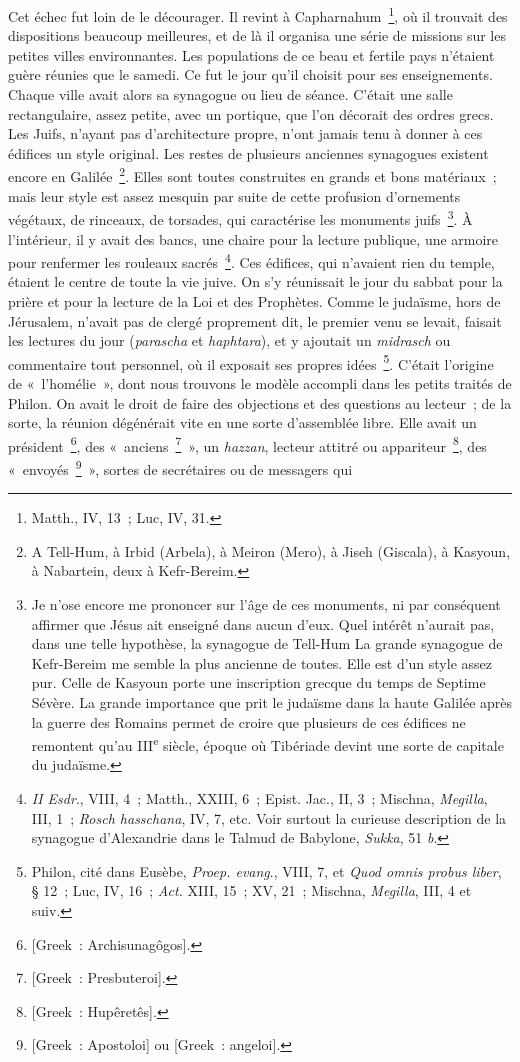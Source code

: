\documentclass[french,twoside]{book} %
\begin{document}
Cet échec fut loin de le décourager. Il revint à Capharnahum \footnote{Matth., IV, 13 ; Luc, IV, 31.}, où il trouvait des dispositions beaucoup meilleures, et de là il organisa une série de missions sur les petites villes environnantes. Les populations de ce beau et fertile pays n’étaient guère réunies que le samedi. Ce fut le jour qu’il choisit pour ses enseignements. Chaque ville avait alors sa synagogue ou lieu de séance. C’était une salle rectangulaire, assez petite, avec un portique, que l’on décorait des ordres grecs. Les Juifs, n’ayant pas d’architecture propre, n’ont jamais tenu à donner à ces édifices un style original. Les restes de plusieurs anciennes synagogues existent encore en Galilée \footnote{A Tell-Hum, à Irbid (Arbela), à Meiron (Mero), à Jiseh (Giscala), à Kasyoun, à Nabartein, deux à Kefr-Bereim.}. Elles sont toutes construites en grands et bons matériaux ; mais leur style est assez mesquin par suite de cette profusion d’ornements végétaux, de rinceaux, de torsades, qui caractérise les monuments juifs \footnote{ Je n’ose encore me prononcer sur l’âge de ces monuments, ni par conséquent affirmer que Jésus ait enseigné dans aucun d’eux. Quel intérêt n’aurait pas, dans une telle hypothèse, la synagogue de Tell-Hum La grande synagogue de Kefr-Bereim me semble la plus ancienne de toutes. Elle est d’un style assez pur. Celle de Kasyoun porte une inscription grecque du temps de Septime Sévère. La grande importance que prit le judaïsme dans la haute Galilée après la guerre des Romains permet de croire que plusieurs de ces édifices ne remontent qu’au III\textsuperscript{e} siècle, époque où Tibériade devint une sorte de capitale du judaïsme.}. À l’intérieur, il y avait des bancs, une chaire pour la lecture publique, une armoire pour renfermer les rouleaux sacrés \footnote{{\itshape II Esdr}., VIII, 4 ; Matth., XXIII, 6 ; Epist. Jac., II, 3 ; Mischna, {\itshape Megilla}, III, 1 ; {\itshape Rosch hasschana}, IV, 7, etc. Voir surtout la curieuse description de la synagogue d’Alexandrie dans le Talmud de Babylone, {\itshape Sukka}, 51 {\itshape b}.}. Ces édifices, qui n’avaient rien du temple, étaient le centre de toute la vie juive. On s’y réunissait le jour du sabbat pour la prière et pour la lecture de la Loi et des Prophètes. Comme le judaïsme, hors de Jérusalem, n’avait pas de clergé proprement dit, le premier venu se levait, faisait les lectures du jour ({\itshape parascha} et {\itshape haphtara}), et y ajoutait un {\itshape midrasch} ou commentaire tout personnel, où il exposait ses propres idées \footnote{ Philon, cité dans Eusèbe, {\itshape Proep. evang}., VIII, 7, et {\itshape Quod omnis probus liber}, § 12 ; Luc, IV, 16 ; {\itshape Act.} XIII, 15 ; XV, 21 ; Mischna, {\itshape Megilla}, III, 4 et suiv.}. C’était l’origine de « l’homélie », dont nous trouvons le modèle accompli dans les petits traités de Philon. On avait le droit de faire des objections et des questions au lecteur ; de la sorte, la réunion dégénérait vite en une sorte d’assemblée libre. Elle avait un président \footnote{[Greek : Archisunagôgos].}, des « anciens \footnote{[Greek : Presbuteroi].} », un {\itshape hazzan}, lecteur attitré ou appariteur \footnote{[Greek : Hupêretês].}, des « envoyés \footnote{[Greek : Apostoloi] ou [Greek : angeloi].} », sortes de secrétaires ou de messagers qui 
\end{document}
